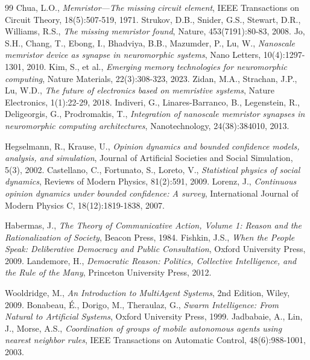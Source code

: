 \documentclass[11pt]{article}
\begin{document}
\begin{thebibliography}{99}
 Chua, L.O., \emph{Memristor—The missing circuit element}, IEEE Transactions on Circuit Theory, 18(5):507-519, 1971.
 Strukov, D.B., Snider, G.S., Stewart, D.R., Williams, R.S., \emph{The missing memristor found}, Nature, 453(7191):80-83, 2008.
 Jo, S.H., Chang, T., Ebong, I., Bhadviya, B.B., Mazumder, P., Lu, W., \emph{Nanoscale memristor device as synapse in neuromorphic systems}, Nano Letters, 10(4):1297-1301, 2010.
 Kim, S., et al., \emph{Emerging memory technologies for neuromorphic computing}, Nature Materials, 22(3):308-323, 2023.
 Zidan, M.A., Strachan, J.P., Lu, W.D., \emph{The future of electronics based on memristive systems}, Nature Electronics, 1(1):22-29, 2018.
 Indiveri, G., Linares-Barranco, B., Legenstein, R., Deligeorgis, G., Prodromakis, T., \emph{Integration of nanoscale memristor synapses in neuromorphic computing architectures}, Nanotechnology, 24(38):384010, 2013.

 Hegselmann, R., Krause, U., \emph{Opinion dynamics and bounded confidence models, analysis, and simulation}, Journal of Artificial Societies and Social Simulation, 5(3), 2002.
 Castellano, C., Fortunato, S., Loreto, V., \emph{Statistical physics of social dynamics}, Reviews of Modern Physics, 81(2):591, 2009.
 Lorenz, J., \emph{Continuous opinion dynamics under bounded confidence: A survey}, International Journal of Modern Physics C, 18(12):1819-1838, 2007.

 Habermas, J., \emph{The Theory of Communicative Action, Volume 1: Reason and the Rationalization of Society}, Beacon Press, 1984.
 Fishkin, J.S., \emph{When the People Speak: Deliberative Democracy and Public Consultation}, Oxford University Press, 2009.
 Landemore, H., \emph{Democratic Reason: Politics, Collective Intelligence, and the Rule of the Many}, Princeton University Press, 2012.

 Wooldridge, M., \emph{An Introduction to MultiAgent Systems}, 2nd Edition, Wiley, 2009.
 Bonabeau, É., Dorigo, M., Theraulaz, G., \emph{Swarm Intelligence: From Natural to Artificial Systems}, Oxford University Press, 1999.
 Jadbabaie, A., Lin, J., Morse, A.S., \emph{Coordination of groups of mobile autonomous agents using nearest neighbor rules}, IEEE Transactions on Automatic Control, 48(6):988-1001, 2003.


\end{thebibliography}
\end{document}
